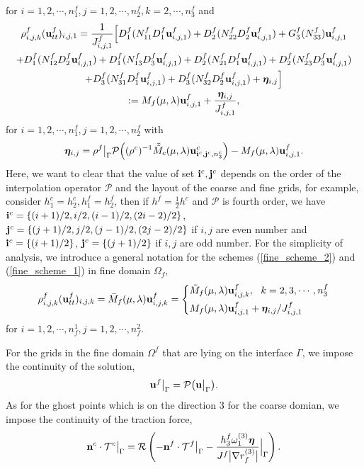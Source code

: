\documentclass[a4paper]{article}
\begin{document}
for $ i = 1,2,\cdots,n_1^f, j = 1,2,\cdots,n_2^f, k = 2,\cdots,n_3^f$ and
\begin{multline}\label{fine_scheme_1}
\rho_{i,j,k}^f ({\bf u}_{tt}^f)_{i,j,1} = \frac{1}{J_{i,j,1}^f}\Big[D_1^f(N_{11}^fD_1^f{\bf u}_{i,j,1}^f)+D_2^f(N_{22}^fD_2^f{\bf u}_{i,j,1}^f)+G_3^f(N_{33}^f){\bf u}_{i,j,1}^f\\
+D_1^f(N_{12}^fD_2^f{\bf u}_{i,j,1}^f)+D_1^f(N_{13}^fD_3^f{\bf u}_{i,j,1}^f)+D_2^f(N_{21}^fD_1^f{\bf u}_{i,j,1}^f)+D_2^f(N_{23}^fD_3^f{\bf u}_{i,j,1}^f)\\
+D_3^f(N_{31}^fD_1^f{\bf u}_{i,j,1}^f)+D_3^f(N_{32}^fD_2^f{\bf u}_{i,j,1}^f)+{\bm \eta}_{i,j}\Big]\\
 := M_f(\mu,\lambda){\bf u}^f_{i,j,1}+\frac{{\bm \eta}_{i,j}}{J^f_{i,j,1}},
\end{multline}
for $ i = 1,2,\cdots,n_1^f, j = 1,2,\cdots,n_2^f$ with
\begin{equation}\label{eta}
{\bm \eta}_{i,j} = \rho^f\big|_\Gamma\mathcal{P}\Big((\rho^c)^{-1}\tilde{\tilde{M}}_c(\mu,\lambda){\bf u}^c_{{\bf i}^c,{\bf j}^c,n_3^c}\Big)-M_f(\mu,\lambda){\bf u}^f_{i,j,1}.
\end{equation}
Here, we want to clear that the value of set ${\bf i}^c, {\bf j}^c$ depends on the order of the interpolation operator $\mathcal{P}$ and the layout of the coarse and fine grids, for example, consider $h_1^c = h_2^c, h_1^f = h_2^f$, then if $h^f = \frac{1}{2}h^c$ and $\mathcal{P}$ is fourth order,  we have ${\bf i}^c = \{(i+1)/2,i/2,(i-1)/2,(2i-2)/2\}$, ${\bf j}^c = \{(j+1)/2,j/2,(j-1)/2,(2j-2)/2\}$ if $i,j$ are even number and ${\bf i}^c = \{(i+1)/2\}$, ${\bf j}^c = \{(j+1)/2\}$ if $i,j$ are odd number. For the simplicity of analysis, we introduce a general notation for the schemes (\ref{fine_scheme_2}) and (\ref{fine_scheme_1}) in fine domain $\Omega_f$,
\begin{equation}\label{fine_scheme}
\rho^f_{i,j,k} ({\bf u}_{tt}^f)_{i,j,k} = \bar{M}_f(\mu,\lambda){\bf u}^f_{i,j,k} =  \left\{
\begin{aligned}
&\tilde{M}_f(\mu,\lambda) {\bf{u}}^f_{i,j,k}, \ \ k = 2,3,\cdots,n_3^f\\
&M_f(\mu,\lambda){\bf u}^f_{i,j,1}+{\bm \eta}_{i,j}/J^f_{i,j,1}
\end{aligned}
\right.
\end{equation}
for $i = 1,2,\cdots,n_f^1, j = 1,2,\cdots,n_f^2$.

For the grids in the fine domain $\Omega^f$  that are lying on the interface $\Gamma$, we impose the continuity of the solution,
\begin{equation}\label{data_continuous_curvi}
{\bf u}^f\big|_{\Gamma} = \mathcal{P}\big({\bf u}\big|_{\Gamma}\big).
\end{equation}
As for the ghost points which is on the direction 3 for the coarse domian, we impose the continuity of the traction force,
\begin{equation}\label{traction_continuous_curvi}
{\bf n}^c\cdot\mathcal{T}^c \big|_\Gamma = \mathcal{R}\left(-{\bf n}^f\cdot\mathcal{T}^f\big|_\Gamma - \frac{h_3^f\omega_1^{(3)}{\bm \eta}}{J^f\big|\nabla r_f^{(3)}\big|}\Big|_\Gamma\right).
\end{equation}
\end{document}
